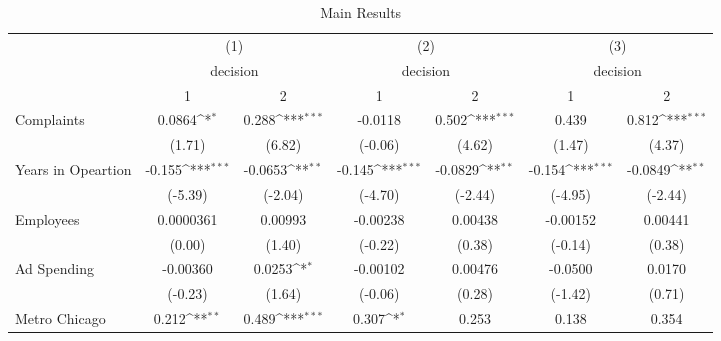 {
\def\sym#1{\ifmmode^{#1}\else\(^{#1}\)\fi}
\begin{longtable}{l*{6}{c}}
\caption{Main Results}\\
\toprule\endfirsthead\midrule\endhead\midrule\endfoot\endlastfoot
                    &\multicolumn{2}{c}{(1)}                    &\multicolumn{2}{c}{(2)}                    &\multicolumn{2}{c}{(3)}                    \\
                    &\multicolumn{2}{c}{decision}               &\multicolumn{2}{c}{decision}               &\multicolumn{2}{c}{decision}               \\
                    &           1         &           2         &           1         &           2         &           1         &           2         \\
\midrule
Complaints          &      0.0864\sym{*}  &       0.288\sym{***}&     -0.0118         &       0.502\sym{***}&       0.439         &       0.812\sym{***}\\
                    &      (1.71)         &      (6.82)         &     (-0.06)         &      (4.62)         &      (1.47)         &      (4.37)         \\
\addlinespace
Years in Opeartion  &      -0.155\sym{***}&     -0.0653\sym{**} &      -0.145\sym{***}&     -0.0829\sym{**} &      -0.154\sym{***}&     -0.0849\sym{**} \\
                    &     (-5.39)         &     (-2.04)         &     (-4.70)         &     (-2.44)         &     (-4.95)         &     (-2.44)         \\
\addlinespace
Employees           &   0.0000361         &     0.00993         &    -0.00238         &     0.00438         &    -0.00152         &     0.00441         \\
                    &      (0.00)         &      (1.40)         &     (-0.22)         &      (0.38)         &     (-0.14)         &      (0.38)         \\
\addlinespace
Ad Spending         &    -0.00360         &      0.0253\sym{*}  &    -0.00102         &     0.00476         &     -0.0500         &      0.0170         \\
                    &     (-0.23)         &      (1.64)         &     (-0.06)         &      (0.28)         &     (-1.42)         &      (0.71)         \\
\addlinespace
Metro Chicago       &       0.212\sym{**} &       0.489\sym{***}&       0.307\sym{*}  &       0.253         &       0.138         &       0.354         \\

\end{longtable}}
